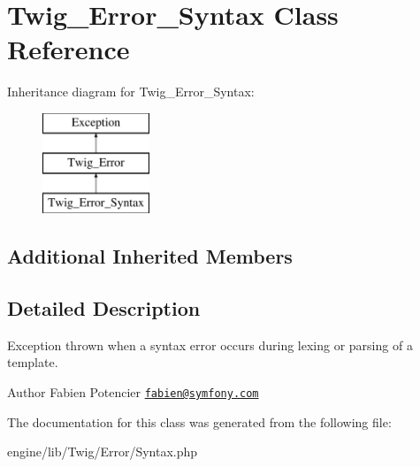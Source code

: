 \hypertarget{class_twig___error___syntax}{}\section{Twig\+\_\+\+Error\+\_\+\+Syntax Class Reference}
\label{class_twig___error___syntax}
Inheritance diagram for Twig\+\_\+\+Error\+\_\+\+Syntax\+:\begin{figure}[H]
\begin{center}
\leavevmode
\includegraphics[height=3.000000cm]{class_twig___error___syntax}
\end{center}
\end{figure}
\subsection*{Additional Inherited Members}


\subsection{Detailed Description}
Exception thrown when a syntax error occurs during lexing or parsing of a template.

\begin{DoxyAuthor}{Author}
Fabien Potencier \href{mailto:fabien@symfony.com}{\tt fabien@symfony.\+com} 
\end{DoxyAuthor}


The documentation for this class was generated from the following file\+:\begin{DoxyCompactItemize}
\item 
engine/lib/\+Twig/\+Error/Syntax.\+php\end{DoxyCompactItemize}
